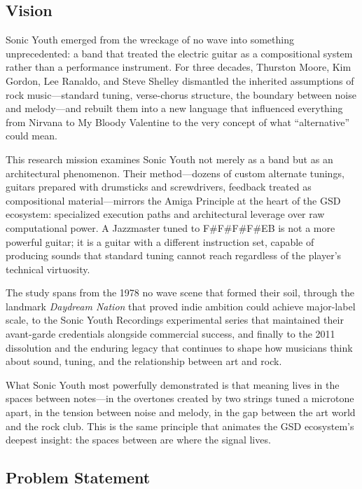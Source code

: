 \documentclass[11pt,letterpaper]{article}
\begin{document}
\subsection{Vision}

Sonic Youth emerged from the wreckage of no wave into something unprecedented: a band that treated the electric guitar as a compositional system rather than a performance instrument. For three decades, Thurston Moore, Kim Gordon, Lee Ranaldo, and Steve Shelley dismantled the inherited assumptions of rock music---standard tuning, verse-chorus structure, the boundary between noise and melody---and rebuilt them into a new language that influenced everything from Nirvana to My Bloody Valentine to the very concept of what ``alternative'' could mean.

This research mission examines Sonic Youth not merely as a band but as an architectural phenomenon. Their method---dozens of custom alternate tunings, guitars prepared with drumsticks and screwdrivers, feedback treated as compositional material---mirrors the Amiga Principle at the heart of the GSD ecosystem: specialized execution paths and architectural leverage over raw computational power. A Jazzmaster tuned to F\#F\#F\#F\#EB is not a more powerful guitar; it is a guitar with a different instruction set, capable of producing sounds that standard tuning cannot reach regardless of the player's technical virtuosity.

The study spans from the 1978 no wave scene that formed their soil, through the landmark \textit{Daydream Nation} that proved indie ambition could achieve major-label scale, to the Sonic Youth Recordings experimental series that maintained their avant-garde credentials alongside commercial success, and finally to the 2011 dissolution and the enduring legacy that continues to shape how musicians think about sound, tuning, and the relationship between art and rock.

What Sonic Youth most powerfully demonstrated is that meaning lives in the spaces between notes---in the overtones created by two strings tuned a microtone apart, in the tension between noise and melody, in the gap between the art world and the rock club. This is the same principle that animates the GSD ecosystem's deepest insight: the spaces between are where the signal lives.

\subsection{Problem Statement}
\end{document}
